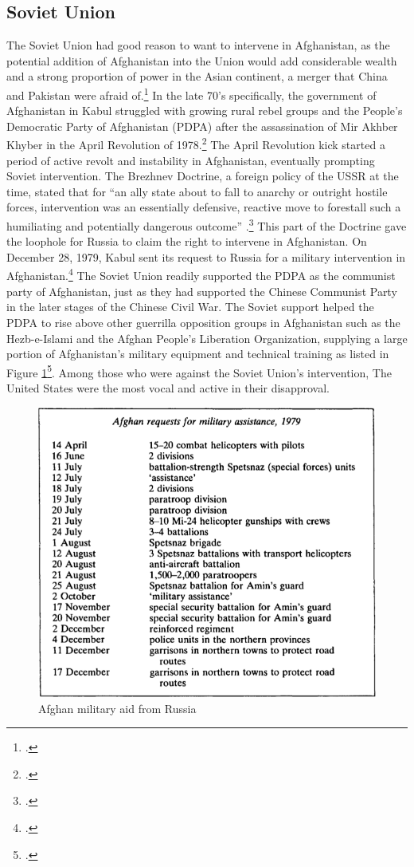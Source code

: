 \documentclass[12pt,letterpaper]{article}
\begin{document}
\subsection{Soviet Union}
The Soviet Union had good reason to want to intervene in Afghanistan, as the potential addition of Afghanistan into the Union would add considerable wealth and a strong proportion of power in the Asian continent, a merger that China and Pakistan were afraid of.\footcite[24-25]{urban_war_1990} In the late 70's specifically, the government of Afghanistan in Kabul struggled with growing rural rebel groups and the People's Democratic Party of Afghanistan (PDPA) after the assassination of Mir Akhber Khyber in the April Revolution of 1978.\footcite[15]{urban_war_1990} The April Revolution kick started a period of active revolt and instability in Afghanistan, eventually prompting Soviet intervention. The Brezhnev Doctrine, a foreign policy of the USSR at the time, stated that for ``an ally state about to fall to anarchy or outright hostile forces, intervention was an essentially defensive, reactive move to forestall such a humiliating and potentially dangerous outcome'' \citeauthor{galeotti_afghanistan:_2012}.\footcite[11]{galeotti_afghanistan:_2012} This part of the Doctrine gave the loophole for Russia to claim the right to intervene in Afghanistan. On December 28, 1979, Kabul sent its request to Russia for a military intervention in Afghanistan.\footcite[559]{guttmann_cold_1988} The Soviet Union readily supported the PDPA as the communist party of Afghanistan, just as they had supported the Chinese Communist Party in the later stages of the Chinese Civil War. The Soviet support helped the PDPA to rise above other guerrilla opposition groups in Afghanistan such as the Hezb-e-Islami and the Afghan People's Liberation Organization, supplying a large portion of Afghanistan's military equipment and technical training as listed in Figure \ref{fig:requests}\footcite[8]{galeotti_afghanistan:_2012}. Among those who were against the Soviet Union's intervention, The United States were the most vocal and active in their disapproval.

\begin{figure}[H]
	\centering
	\caption{Afghan military aid from Russia}
	\label{fig:requests}
	\includegraphics[width=.6\linewidth]{requests}
\end{figure}
\end{document}
